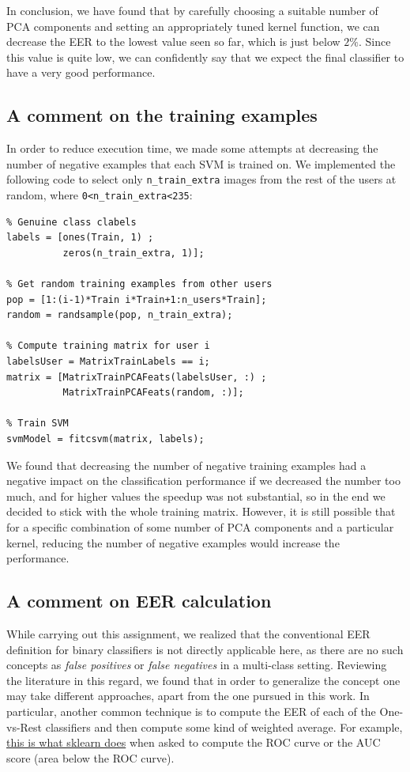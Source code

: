 \documentclass[11pt]{article}
\begin{document}
In conclusion, we have found that by carefully choosing a suitable number of PCA components and setting an appropriately tuned kernel function, we can decrease the EER to the lowest value seen so far, which is just below $2\%$. Since this value is quite low, we can confidently say that we expect the final classifier to have a very good performance.

\subsection*{A comment on the training examples}

In order to reduce execution time, we made some attempts at decreasing the number of negative examples that each SVM is trained on. We implemented the following code to select only \verb|n_train_extra| images from the rest of the users at random, where \verb|0<n_train_extra<235|:
\begin{verbatim}
% Genuine class clabels
labels = [ones(Train, 1) ;
          zeros(n_train_extra, 1)];

% Get random training examples from other users
pop = [1:(i-1)*Train i*Train+1:n_users*Train];
random = randsample(pop, n_train_extra);

% Compute training matrix for user i
labelsUser = MatrixTrainLabels == i;
matrix = [MatrixTrainPCAFeats(labelsUser, :) ;
          MatrixTrainPCAFeats(random, :)];

% Train SVM
svmModel = fitcsvm(matrix, labels);
\end{verbatim}

We found that decreasing the number of negative training examples had a negative impact on the classification performance if we decreased the number too much, and for higher values the speedup was not substantial, so in the end we decided to stick with the whole training matrix. However, it is still possible that for a specific combination of some number of PCA components and a particular kernel, reducing the number of negative examples would increase the performance.

\subsection*{A comment on EER calculation}

While carrying out this assignment, we realized that the conventional EER definition for binary classifiers is not directly applicable here, as there are no such concepts as \textit{false positives} or \textit{false negatives} in a multi-class setting. Reviewing the literature in this regard, we found that in order to generalize the concept one may take different approaches, apart from the one pursued in this work. In particular, another common technique is to compute the EER of each of the One-vs-Rest classifiers and then compute some kind of weighted average. For example, \href{https://scikit-learn.org/stable/auto_examples/model_selection/plot_roc.html}{this is what sklearn does} when asked to compute the ROC curve or the AUC score (area below the ROC curve).
\end{document}
